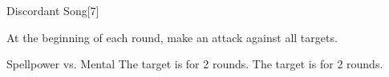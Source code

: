 \begin{spellsection}{Discordant Song}[7]
    \begin{spellheader}
    \end{spellheader}
    \begin{spellcontent}
        \begin{spelltargetinginfo}
        \end{spelltargetinginfo}
        \begin{spelleffects}
            \spelleffect At the beginning of each round, make an attack against all targets.
            \begin{spellattack}{Spellpower vs. Mental}
                \spellsuccess The target is \disoriented for 2 rounds.
                \spellcritical The target is \confused for 2 rounds.
            \end{spellattack}
            \spelldur \durshort
        \end{spelleffects}
    \end{spellcontent}
    \begin{spellfooter}
        \miscastyou
    \end{spellfooter}
\end{spellsection}

